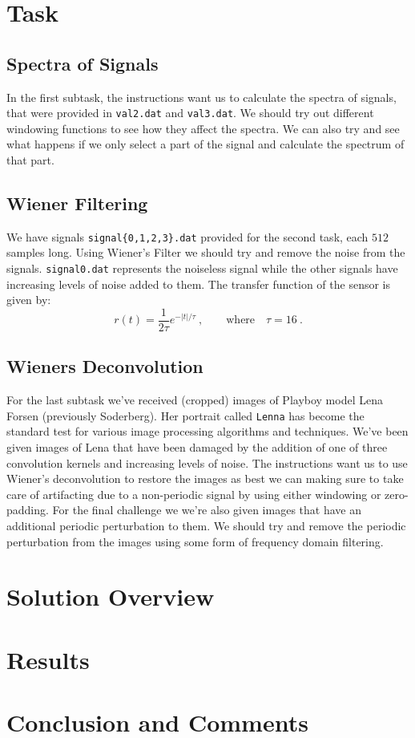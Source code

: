 \documentclass[10pt, titlepage, a4paper]{article}
\begin{document}
\section{Task}
\subsection{Spectra of Signals}
In the first subtask, the instructions want us to calculate the spectra of signals, that were provided in \texttt{val2.dat} and \texttt{val3.dat}. We should 
try out different windowing functions to see how they affect the spectra. We can also try and see what happens if we only select a part of the signal and
calculate the spectrum of that part. 

\subsection{Wiener Filtering}
We have signals \texttt{signal\{0,1,2,3\}.dat} provided for the second task, each $512$ samples long.  Using Wiener's Filter we should try and 
remove the noise from the signals. \texttt{signal0.dat} represents the noiseless signal while the other signals have increasing levels of noise added to them.
The transfer function of the sensor is given by:
%
\begin{equation}
    r(t) = \frac{1}{2\tau} e^{-|t|/\tau}\>, \quad\quad\text{where}\quad\tau = 16\>.
\end{equation}
%
\subsection{Wieners Deconvolution}
For the last subtask we've received (cropped) images of Playboy model Lena Forsen (previously Soderberg). Her portrait called \texttt{Lenna} has become 
the standard test for various image processing algorithms and techniques. We've been given images of Lena that have been damaged by the addition of one of 
three convolution kernels and increasing levels of noise. The instructions want us to use Wiener's deconvolution to restore the images as best we can making sure 
to take care of artifacting due to a non-periodic signal by using either windowing or zero-padding. For the final challenge we we're also given images that 
have an additional periodic perturbation to them. We should try and remove the periodic perturbation from the images using some form of 
frequency domain filtering.

\section{Solution Overview}
\section{Results}
\section{Conclusion and Comments}

% 
% 

\end{document}
